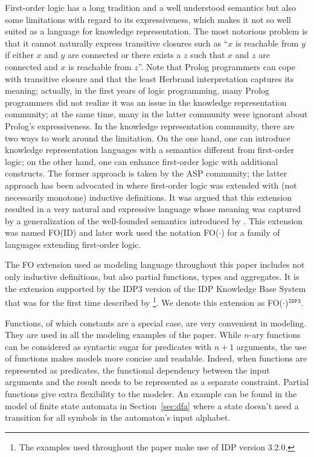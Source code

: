 \documentclass{tlp}
\newcommand{\idp}{{\sc IDP}\xspace}
\newcommand{\idpdrie}{{\sc IDP3}\xspace}
\newcommand{\fodotidp}{{\sc FO($\cdot$)$^{\mathtt{IDP3}}$}\xspace}
\newcommand{\fodot}{{\sc FO($\cdot$)}\xspace}
\newcommand{\fodotid}{{\sc FO(ID)}\xspace}
\renewcommand{\|}{\ensuremath{\,|\,}}
\renewcommand{\|}{\,|\,}
\begin{document}
First-order logic has a long tradition and a well understood semantics
but also some limitations with regard to its expressiveness, which
makes it not so well suited as a language for knowledge
representation. The most notorious problem is that it cannot naturally express transitive closures such as ``$x$ is reachable from $y$ if either $x$
and $y$ are connected or there exists a $z$ such that $x$ and $z$ are
connected and $x$ is reachable from $z$''.
%
Note that Prolog programmers can cope with transitive closure and that
the least Herbrand interpretation captures its meaning; actually, in
the first years of logic programming, many Prolog programmers did not
realize it was an issue in the knowledge representation community; at
the same time, many in the latter community were ignorant about
Prolog's expressiveness.
%
In the knowledge
representation community, there are two ways to work around the
limitation. On the one hand, one can introduce knowledge
representation languages with a semantics different from first-order
logic; on the other hand, one can enhance first-order logic with
additional constructs.  The former approach is taken by the ASP
community; the latter approach has been advocated in
\cite{tocl/DeneckerT08} where first-order logic was extended with (not
necessarily monotone) inductive definitions. It was argued that this
extension resulted in a very natural and expressive language whose
meaning was captured by a generalization of the well-founded semantics
introduced by . This extension was named \fodotid
and later work used the notation \fodot for a family of languages
extending first-order logic.

The FO extension used as modeling language throughout this paper
includes not only inductive definitions, but also partial functions,
types and aggregates. It is the extension supported by the \idpdrie
version of the \idp Knowledge Base System that was for the first time
described by \footnote{The examples used
  throughout the paper make use of IDP version 3.2.0.}. We denote this
extension as \fodotidp.

Functions, of which constants are a special case, are very convenient
in modeling. They are used in all the modeling examples of the
paper. While $n$-ary functions can be considered as syntactic sugar
for predicates with $n+1$ arguments, the use of functions makes models
more concise and readable. Indeed, when functions are represented as
predicates, the functional dependency between the input arguments and
the result needs to be represented as a separate constraint. Partial
functions give extra flexibility to the modeler. An example can be
found in the model of finite state automata in Section~\ref{sec:dfa}
where a state doesn't need a transition for all symbols in the
automaton's input alphabet.
\end{document}
